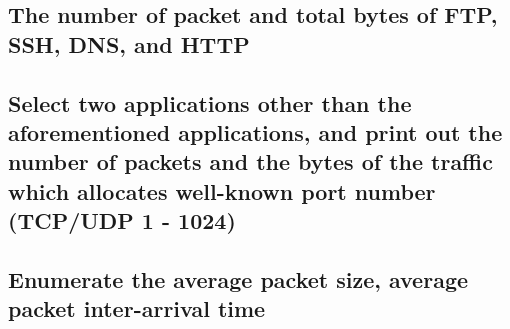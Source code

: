 \documentclass[a4paper,11pt]{article}
\begin{document}
\subsection{The number of packet and total bytes of FTP, SSH, DNS,  and HTTP}
\subsection{Select  two  applications  other  than  the  aforementioned  applications,  and  print  out  the  number  of packets and the bytes of the traffic which allocates well-known  port  number  (TCP/UDP 1 - 1024) }
\subsection{Enumerate the average packet size, average packet inter-arrival time }
\end{document}
